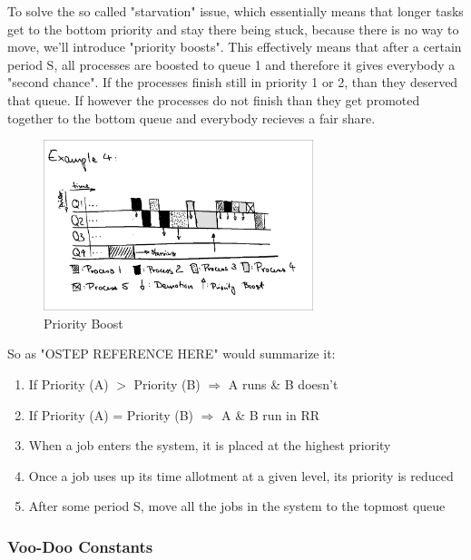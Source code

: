\documentclass{report}
\begin{document}
To solve the so called "starvation" issue, which essentially means that longer tasks get to the bottom priority and stay there being stuck, because there is no way to move, we'll introduce "priority boosts".
This effectively means that after a certain period S, all processes are boosted to queue 1 and therefore it gives everybody a "second chance". If the processes finish still in priority 1 or 2, than they deserved that queue.
If however the processes do not finish than they get promoted together to the bottom queue and everybody recieves a fair share.

\begin{figure}[h]
  \begin{center}
    \includegraphics[width=0.7\textwidth]{assets/mlfq-diag-4.png}
    \caption{Priority Boost}
    \label{mlfq-diag-4}
  \end{center}
\end{figure}

\noindent So as "OSTEP REFERENCE HERE" would summarize it: %
\begin{enumerate}
  \item If Priority (A) $>$ Priority (B) $\Rightarrow$ A runs \& B doesn't
  \item If Priority (A) = Priority (B) $\Rightarrow$ A \& B run in RR
  \item When a job enters the system, it is placed at the highest priority
  \item Once a job uses up its time allotment at a given level, its priority is reduced
  \item After some period S, move all the jobs in the system to the topmost queue
\end{enumerate}

\subsubsection{Voo-Doo Constants}
\end{document}
